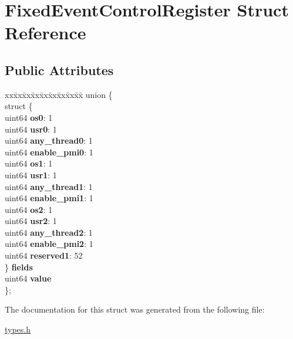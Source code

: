 \hypertarget{struct_fixed_event_control_register}{}\section{Fixed\+Event\+Control\+Register Struct Reference}
\label{struct_fixed_event_control_register}
\subsection*{Public Attributes}
\begin{DoxyCompactItemize}
\item 
\mbox{\label{struct_fixed_event_control_register_a08d80e327beeeb53624e77d3f9101b68}} 
\begin{tabbing}
xx\=xx\=xx\=xx\=xx\=xx\=xx\=xx\=xx\=\kill
union \{\\
\>struct \{\\
\>\>uint64 {\bfseries os0}: 1\\
\>\>uint64 {\bfseries usr0}: 1\\
\>\>uint64 {\bfseries any\_thread0}: 1\\
\>\>uint64 {\bfseries enable\_pmi0}: 1\\
\>\>uint64 {\bfseries os1}: 1\\
\>\>uint64 {\bfseries usr1}: 1\\
\>\>uint64 {\bfseries any\_thread1}: 1\\
\>\>uint64 {\bfseries enable\_pmi1}: 1\\
\>\>uint64 {\bfseries os2}: 1\\
\>\>uint64 {\bfseries usr2}: 1\\
\>\>uint64 {\bfseries any\_thread2}: 1\\
\>\>uint64 {\bfseries enable\_pmi2}: 1\\
\>\>uint64 {\bfseries reserved1}: 52\\
\>\} {\bfseries fields}\\
\>uint64 {\bfseries value}\\
\}; \\

\end{tabbing}\end{DoxyCompactItemize}


The documentation for this struct was generated from the following file\+:\begin{DoxyCompactItemize}
\item 
\mbox{\hyperlink{types_8h}{types.\+h}}\end{DoxyCompactItemize}
